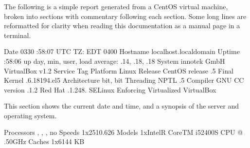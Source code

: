 \documentclass[letterpaper,10pt,english]{sphinxmanual}
\begin{document}
\sphinxAtStartPar
The following is a simple report generated from a CentOS virtual machine,
broken into sections with commentary following each section. Some long lines
are reformatted for clarity when reading this documentation as a manual page in
a terminal.

\begin{sphinxVerbatim}[commandchars=\\\{\}]
        Date  \PYGZhy{}03\PYGZhy{}30 :58:07 UTC  TZ: EDT \PYGZhy{}0400
    Hostname  localhost.localdomain
      Uptime  :58:06 up  day,  min,  user,
               load average: .14, .18, .18
      System  innotek GmbH VirtualBox v1.2 
 Service Tag  
    Platform  Linux
     Release  CentOS release .5 Final
      Kernel  .6.18\PYGZhy{}194.el5
Architecture    \PYGZhy{}bit,   \PYGZhy{}bit
   Threading  NPTL .5
    Compiler  GNU CC version .1.2  Red Hat .1.2\PYGZhy{}48.
     SELinux  Enforcing
 Virtualized  VirtualBox
\end{sphinxVerbatim}

\sphinxAtStartPar
This section shows the current date and time, and a synopsis of the server and
operating system.

\begin{sphinxVerbatim}[commandchars=\\\{\}]
  Processors    ,   ,   ,   no
      Speeds  1x2510.626
      Models  1xIntelR CoreTM i5\PYGZhy{}2400S CPU @ .50GHz
      Caches  1x6144 KB
\end{sphinxVerbatim}
\end{document}

